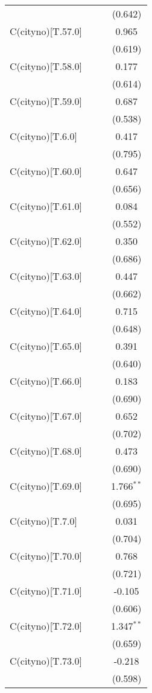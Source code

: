 \begin{table}[!htbp]
\begin{tabular}{@{\extracolsep{5pt}}lccc}
& & & (0.642) \\
 C(cityno)[T.57.0] & & & 0.965$^{}$ \\
& & & (0.619) \\
 C(cityno)[T.58.0] & & & 0.177$^{}$ \\
& & & (0.614) \\
 C(cityno)[T.59.0] & & & 0.687$^{}$ \\
& & & (0.538) \\
 C(cityno)[T.6.0] & & & 0.417$^{}$ \\
& & & (0.795) \\
 C(cityno)[T.60.0] & & & 0.647$^{}$ \\
& & & (0.656) \\
 C(cityno)[T.61.0] & & & 0.084$^{}$ \\
& & & (0.552) \\
 C(cityno)[T.62.0] & & & 0.350$^{}$ \\
& & & (0.686) \\
 C(cityno)[T.63.0] & & & 0.447$^{}$ \\
& & & (0.662) \\
 C(cityno)[T.64.0] & & & 0.715$^{}$ \\
& & & (0.648) \\
 C(cityno)[T.65.0] & & & 0.391$^{}$ \\
& & & (0.640) \\
 C(cityno)[T.66.0] & & & 0.183$^{}$ \\
& & & (0.690) \\
 C(cityno)[T.67.0] & & & 0.652$^{}$ \\
& & & (0.702) \\
 C(cityno)[T.68.0] & & & 0.473$^{}$ \\
& & & (0.690) \\
 C(cityno)[T.69.0] & & & 1.766$^{**}$ \\
& & & (0.695) \\
 C(cityno)[T.7.0] & & & 0.031$^{}$ \\
& & & (0.704) \\
 C(cityno)[T.70.0] & & & 0.768$^{}$ \\
& & & (0.721) \\
 C(cityno)[T.71.0] & & & -0.105$^{}$ \\
& & & (0.606) \\
 C(cityno)[T.72.0] & & & 1.347$^{**}$ \\
& & & (0.659) \\
 C(cityno)[T.73.0] & & & -0.218$^{}$ \\
& & & (0.598) \\

\end{tabular}
\end{table}

